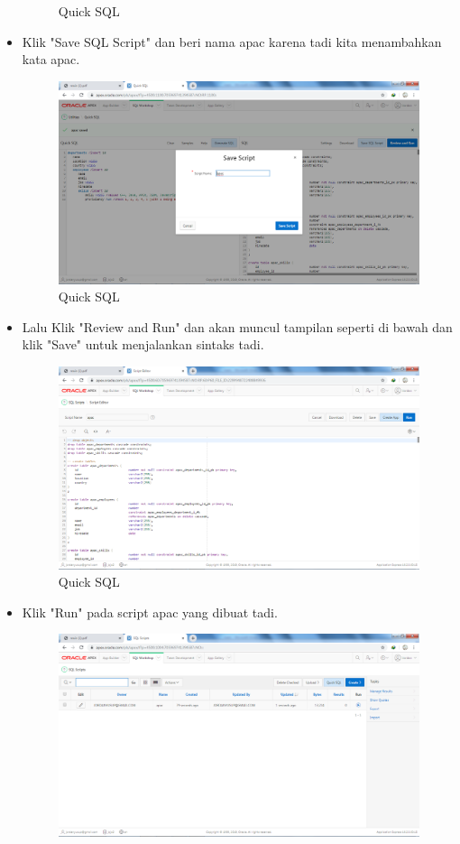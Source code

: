 \documentclass[12pt, times new roman]{article}
\begin{document}
\begin{itemize}
\begin{figure}[!htpb]
	\caption{Quick SQL}
\end{figure}
\item Klik "Save SQL Script" dan beri nama apac karena tadi kita menambahkan kata apac.
\begin{figure}[!htpb]
	\centering
	\includegraphics[width=12.5cm]{figures/Screenshot_17.png}
	\caption{Quick SQL}
\end{figure}
\item Lalu Klik "Review and Run" dan akan muncul tampilan seperti di bawah dan klik "Save" untuk menjalankan sintaks tadi.
\begin{figure}[!htpb]
	\centering
	\includegraphics[width=12.5cm]{figures/Screenshot_18.png}
	\caption{Quick SQL}
\end{figure}
\item Klik "Run" pada script apac yang dibuat tadi.
\begin{figure}[!htpb]
	\centering
	\includegraphics[width=12cm]{figures/Screenshot_19.png}

\end{figure}
\end{itemize}
\end{document}

